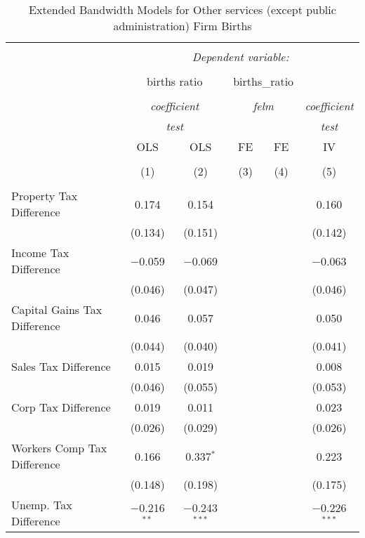 
\begin{table}[!htbp] \centering 
  \caption{Extended Bandwidth Models for  Other services (except public administration) Firm Births} 
  \label{} 
\begin{tabular}{@{\extracolsep{5pt}}lccccc} 
\\[-1.8ex]\hline 
\hline \\[-1.8ex] 
 & \multicolumn{5}{c}{\textit{Dependent variable:}} \\ 
\cline{2-6} 
\\[-1.8ex] & \multicolumn{2}{c}{births ratio} & \multicolumn{2}{c}{births\_ratio} &   \\ 
\\[-1.8ex] & \multicolumn{2}{c}{\textit{coefficient}} & \multicolumn{2}{c}{\textit{felm}} & \textit{coefficient} \\ 
 & \multicolumn{2}{c}{\textit{test}} & \multicolumn{2}{c}{\textit{}} & \textit{test} \\ 
 & OLS & OLS & FE & FE & IV \\ 
\\[-1.8ex] & (1) & (2) & (3) & (4) & (5)\\ 
\hline \\[-1.8ex] 
 Property Tax Difference & 0.174 & 0.154 &  &  & 0.160 \\ 
  & (0.134) & (0.151) &  &  & (0.142) \\ 
  Income Tax Difference & $-$0.059 & $-$0.069 &  &  & $-$0.063 \\ 
  & (0.046) & (0.047) &  &  & (0.046) \\ 
  Capital Gains Tax Difference & 0.046 & 0.057 &  &  & 0.050 \\ 
  & (0.044) & (0.040) &  &  & (0.041) \\ 
  Sales Tax Difference & 0.015 & 0.019 &  &  & 0.008 \\ 
  & (0.046) & (0.055) &  &  & (0.053) \\ 
  Corp Tax Difference & 0.019 & 0.011 &  &  & 0.023 \\ 
  & (0.026) & (0.029) &  &  & (0.026) \\ 
  Workers Comp Tax Difference & 0.166 & 0.337$^{*}$ &  &  & 0.223 \\ 
  & (0.148) & (0.198) &  &  & (0.175) \\ 
  Unemp. Tax Difference & $-$0.216$^{**}$ & $-$0.243$^{***}$ &  &  & $-$0.226$^{***}$ \\ 

\end{tabular}
\end{table}
